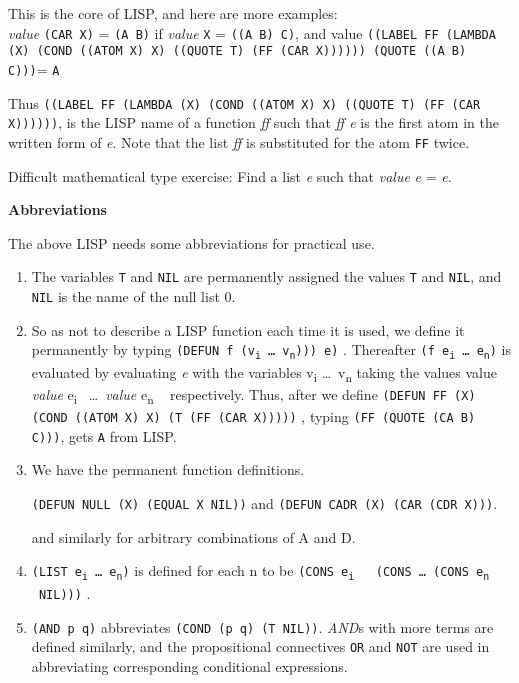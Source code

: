 \documentclass[10pt,a4paper,twocolumn]{article}
\newcommand{\args}[1] {#1\textsubscript{i} \dots \ #1\textsubscript{n}}
\newcommand{\ei}[0] {e\textsubscript{i} \ }
\newcommand{\en}[0] {e\textsubscript{n} \ }
\begin{document}
This is the core of LISP, and here are more examples:  \\

\textit{value} \texttt{(CAR X)} = \texttt{(A B)} if \textit{value} \texttt{X} =
\texttt{((A B) C)}, and value \texttt{((LABEL FF (LAMBDA (X) (COND ((ATOM X) X)
  ((QUOTE T) (FF (CAR X)))))) (QUOTE ((A B) C)))}= \texttt{A}

Thus \texttt{((LABEL FF (LAMBDA (X) (COND ((ATOM X) X) ((QUOTE T) (FF (CAR
  X))))))}, is the LISP name of a function \textit{ff} such that \textit{ff e}
is the first atom in the written form of \textit{e}. Note that the list
\textit{ff} is substituted for the atom \texttt{FF} twice.

Difficult mathematical type exercise: Find a list \textit{e} such that
\textit{value} \textit{e} = \textit{e}.

\vspace*{1\baselineskip}
\textbf{Abbreviations}
\vspace*{1\baselineskip}

The above LISP needs some abbreviations for practical use.

\begin{enumerate}

\item The variables \texttt{T} and \texttt{NIL} are permanently assigned the
  values \texttt{T} and \texttt{NIL}, and \texttt{NIL} is the name of the null
  list 0.

\item So as not to describe a LISP function each time it is used, we define it
  permanently by typing \texttt{(DEFUN f (\args{v}))) e)} . Thereafter
  \texttt{(f \args{e})} is evaluated by evaluating \textit{e} with the variables
  \args{v} taking the values value \textit{value} \ei \dots \ \textit{value} \en
  respectively. Thus, after we define \texttt{(DEFUN FF (X) (COND ((ATOM X) X)
    (T (FF (CAR X)))))} , typing \texttt{(FF (QUOTE (CA B) C)))}, gets
  \texttt{A} from LISP.

\item We have the permanent function definitions.

  \texttt{(DEFUN NULL (X) (EQUAL X NIL))} and \texttt{(DEFUN CADR (X) (CAR (CDR
    X)))}.

  and similarly for arbitrary combinations of A and D.

\item \texttt{(LIST \args{e})} is defined for each n to be \texttt{(CONS \ei
    (CONS \dots \ (CONS \en NIL)))} .

\item \texttt{(AND p q)} abbreviates \texttt{(COND (p q) (T NIL))}.
  \textit{AND}s with more terms are defined similarly, and the propositional
  connectives \texttt{OR} and \texttt{NOT} are used in abbreviating
  corresponding conditional expressions.

\end{enumerate}
\end{document}
